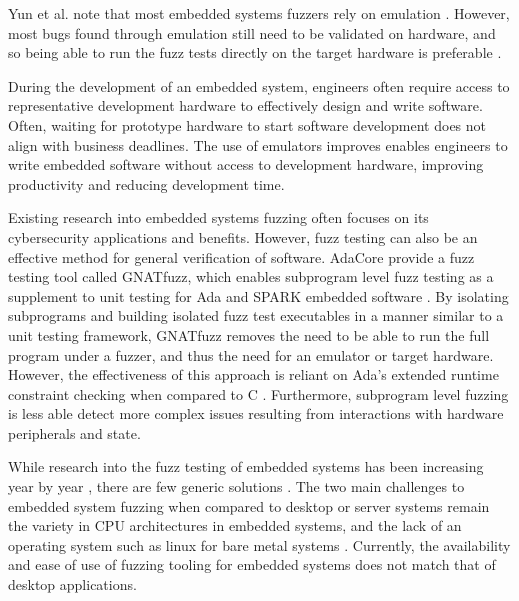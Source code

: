 \documentclass[../report.tex]{subfiles}
\begin{document}
Yun et al. note that most embedded systems fuzzers rely on emulation
\citep{Yun_2022}. However, most bugs found through emulation still need to be
validated on hardware, and so being able to run the fuzz tests directly on the
target hardware is preferable \citep{Eisele_et_al_2022}.

During the development of an embedded system, engineers often require access to
representative development hardware to effectively design and write software.
Often, waiting for prototype hardware to start software development does not
align with business deadlines. The use of emulators improves enables engineers
to write embedded software without access to development hardware, improving
productivity and reducing development time.

Existing research into embedded systems fuzzing often focuses on its
cybersecurity applications and benefits. However, fuzz testing can also be an
effective method for general verification of software. AdaCore provide a fuzz
testing tool called GNATfuzz, which enables subprogram level fuzz testing as a
supplement to unit testing for Ada and SPARK embedded software
\citep{gnatfuzz}. By isolating subprograms and building isolated fuzz test
executables in a manner similar to a unit testing framework, GNATfuzz removes
the need to be able to run the full program under a fuzzer, and thus the need
for an emulator or target hardware. However, the effectiveness of this approach
is reliant on Ada's extended runtime constraint checking when compared to C
\citep{gnatfuzz}. Furthermore, subprogram level fuzzing is less able detect
more complex issues resulting from interactions with hardware peripherals and
state.

While research into the fuzz testing of embedded systems has been increasing
year by year \citep{Yun_2022}, there are few generic solutions
\citep{Eisele_et_al_2022}. The two main challenges to embedded system fuzzing
when compared to desktop or server systems remain the variety in CPU
architectures in embedded systems, and the lack of an operating system such as
linux for bare metal systems \citep{Eisele_et_al_2022}. Currently, the
availability and ease of use of fuzzing tooling for embedded systems does not
match that of desktop applications.
\end{document}
